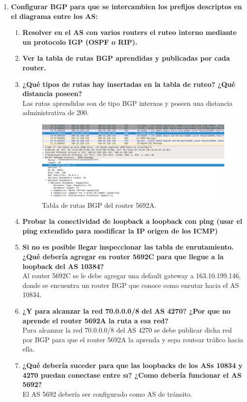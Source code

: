 \documentclass[letterpaper,12pt]{article}
\begin{document}
\begin{enumerate}
		\item \textbf{Configurar BGP para que se intercambien los prefijos descriptos en el diagrama entre los AS:}
		\begin{enumerate}
			\item \textbf{Resolver en el AS con varios routers el ruteo interno mediante un protocolo IGP (OSPF o RIP).}
			\item \textbf{Ver la tabla de rutas BGP aprendidas y publicadas por cada router.}
			\item \textbf{¿Qué tipos de rutas hay insertadas en la tabla de ruteo? ¿Qué distancia poseen?}\\
			Las rutas aprendidas son de tipo BGP internas y poseen una distancia administrativa de 200.
			
			\begin{figure}[H]
				\centering \includegraphics[width=1\columnwidth]{figure/bgp-open.png}
				\caption{
					\label{fig:samplesetup} %
					Tabla de rutas BGP del router 5692A.
				}
			\end{figure}
			
			\item \textbf{Probar la conectividad de loopback a loopback con ping (usar el ping extendido para modificar la IP origen de los ICMP)}
			\item \textbf{Si no es posible llegar inspeccionar las tabla de enrutamiento. ¿Qué debería agregar en router 5692C para que llegue a la loopback del AS 10384?}\\
			Al router 5692C se le debe agregar una default gateway a 163.10.199.146, donde se encuentra un router BGP que conoce como enrutar hacia el AS 10834.
			\item \textbf{¿Y para alcanzar la red 70.0.0.0/8 del AS 4270? ¿Por que no aprende el router 5692A la ruta a esa red?}\\
			Para alcanzar la red 70.0.0.0/8 del AS 4270 se debe publicar dicha red por BGP para que el router 5692A la aprenda y sepa routear tráfico hacia ella.
			\item \textbf{¿Qué debería suceder para que las loopbacks de los ASs 10834 y 4270 puedan conectase entre sı? ¿Como debería funcionar el AS 5692?}\\
			El AS 5692 debería ser configurado como AS de tránsito.
		\end{enumerate}
		

\end{enumerate}
\end{document}
